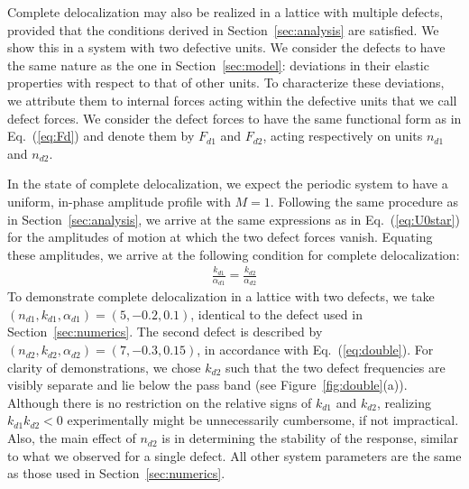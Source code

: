 \documentclass[aps,pre,twocolumn,groupedaddress]{revtex4-1}
\begin{document}
Complete delocalization may also be realized in a lattice with multiple defects, provided that the conditions derived in Section~\ref{sec:analysis} are satisfied. %
{\color{black}We show this in a system with two defective units. We consider the defects to have the same nature as the one in Section~\ref{sec:model}: deviations in their elastic properties with respect to that of other units. To characterize these deviations, we attribute them to internal forces acting within the defective units that we call defect forces. We consider the defect forces to have the same functional form as in Eq.~({\ref{eq:Fd}}) and denote them by $F_{d1}$ and $F_{d2}$, acting respectively on units $n_{d1}$ and $n_{d2}$. 
} 

In the state of complete delocalization, we expect the periodic system to have a uniform, in-phase amplitude profile with $M=1$. Following the same procedure as in Section~\ref{sec:analysis}, we arrive at the same expressions as in Eq.~(\ref{eq:U0star}) for the amplitudes of motion at which the two defect forces vanish. Equating these amplitudes, we arrive at the following condition for complete delocalization: 
\begin{eqnarray}
	\label{eq:double}
	\frac{k_{d1}}{\alpha_{d1}}=\frac{k_{d2}}{\alpha_{d2}}
\end{eqnarray}
To demonstrate complete delocalization in a lattice with two defects, we take $(n_{d1},k_{d1},\alpha_{d1})=(5,-0.2,0.1)$, identical to the defect used in Section~\ref{sec:numerics}. The second defect is described by $(n_{d2},k_{d2},\alpha_{d2})=(7,-0.3,0.15)$, in accordance with Eq.~(\ref{eq:double}). 
{\color{black}For clarity of demonstrations, we chose $k_{d2}$ such that the two defect frequencies are visibly separate and lie below the pass band (see Figure~\ref{fig:double}(a)). Although there is no restriction on the relative signs of $k_{d1}$ and $k_{d2}$, realizing $k_{d1}k_{d2}<0$ experimentally might be unnecessarily cumbersome, if not impractical. Also, the main effect of $n_{d2}$ is in determining the stability of the response, similar to what we observed for a single defect.}
All other system parameters are the same as those used in Section~\ref{sec:numerics}. 
\end{document}

